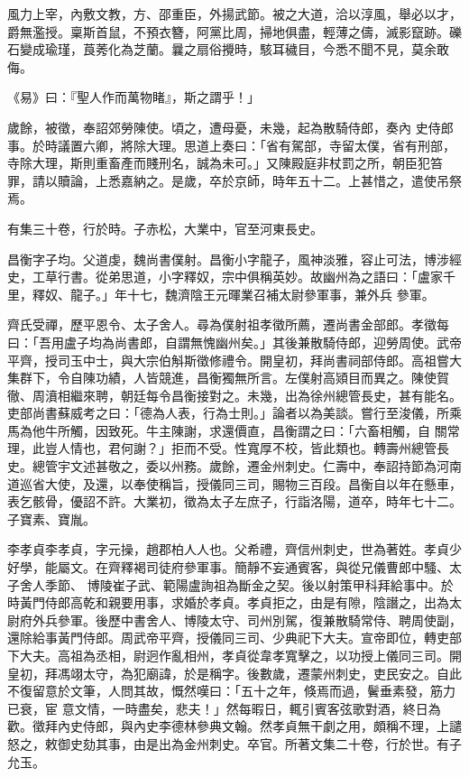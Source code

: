 \begin{pinyinscope}
 風力上宰，內敷文教，方、邵重臣，外揚武節。被之大道，洽以淳風，舉必以才，爵無濫授。稟斯首鼠，不預衣簪，阿黨比周，掃地俱盡，輕薄之儔，滅影竄跡。礫石變成瑜瑾，莨莠化為芝蘭。曩之扇俗攪時，駭耳穢目，今悉不聞不見，莫余敢侮。



 《易》曰：『聖人作而萬物睹』，斯之謂乎！」



 歲餘，被徵，奉詔郊勞陳使。頃之，遭母憂，未幾，起為散騎侍郎，奏內
 史侍郎事。於時議置六卿，將除大理。思道上奏曰：「省有駕部，寺留太僕，省有刑部，寺除大理，斯則重畜產而賤刑名，誠為未可。」又陳殿庭非杖罰之所，朝臣犯笞罪，請以贖論，上悉嘉納之。是歲，卒於京師，時年五十二。上甚惜之，遣使吊祭焉。



 有集三十卷，行於時。子赤松，大業中，官至河東長史。



 昌衡字子均。父道虔，魏尚書僕射。昌衡小字龍子，風神淡雅，容止可法，博涉經史，工草行書。從弟思道，小字釋奴，宗中俱稱英妙。故幽州為之語曰：「盧家千里，釋奴、龍子。」年十七，魏濟陰王元暉業召補太尉參軍事，兼外兵
 參軍。



 齊氏受禪，歷平恩令、太子舍人。尋為僕射祖孝徵所薦，遷尚書金部郎。孝徵每曰：「吾用盧子均為尚書郎，自謂無愧幽州矣。」其後兼散騎侍郎，迎勞周使。武帝平齊，授司玉中士，與大宗伯斛斯徵修禮令。開皇初，拜尚書祠部侍郎。高祖嘗大集群下，令自陳功績，人皆競進，昌衡獨無所言。左僕射高熲目而異之。陳使賀徹、周濆相繼來聘，朝廷每令昌衡接對之。未幾，出為徐州總管長史，甚有能名。吏部尚書蘇威考之曰：「德為人表，行為士則。」論者以為美談。嘗行至浚儀，所乘馬為他牛所觸，因致死。牛主陳謝，求還價直，昌衡謂之曰：「六畜相觸，自
 關常理，此豈人情也，君何謝？」拒而不受。性寬厚不校，皆此類也。轉壽州總管長史。總管宇文述甚敬之，委以州務。歲餘，遷金州刺史。仁壽中，奉詔持節為河南道巡省大使，及還，以奉使稱旨，授儀同三司，賜物三百段。昌衡自以年在懸車，表乞骸骨，優詔不許。大業初，徵為太子左庶子，行詣洛陽，道卒，時年七十二。子寶素、寶胤。



 李孝貞李孝貞，字元操，趙郡柏人人也。父希禮，齊信州刺史，世為著姓。孝貞少好學，能屬文。在齊釋褐司徒府參軍事。簡靜不妄通賓客，與從兄儀曹郎中騷、太子舍人季節、
 博陵崔子武、範陽盧詢祖為斷金之契。後以射策甲科拜給事中。於時黃門侍郎高乾和親要用事，求婚於孝貞。孝貞拒之，由是有隙，陰譖之，出為太尉府外兵參軍。後歷中書舍人、博陵太守、司州別駕，復兼散騎常侍、聘周使副，還除給事黃門侍郎。周武帝平齊，授儀同三司、少典祀下大夫。宣帝即位，轉吏部下大夫。高祖為丞相，尉迥作亂相州，孝貞從韋孝寬擊之，以功授上儀同三司。開皇初，拜馮翊太守，為犯廟諱，於是稱字。後數歲，遷蒙州刺史，吏民安之。自此不復留意於文筆，人問其故，慨然嘆曰：「五十之年，倏焉而過，鬢垂素發，筋力已衰，宦
 意文情，一時盡矣，悲夫！」然每暇日，輒引賓客弦歌對酒，終日為歡。徵拜內史侍郎，與內史李德林參典文翰。然孝貞無干劇之用，頗稱不理，上譴怒之，敕御史劾其事，由是出為金州刺史。卒官。所著文集二十卷，行於世。有子允玉。




\end{pinyinscope}

